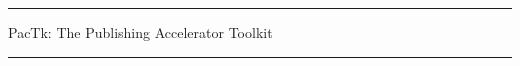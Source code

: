 \documentclass[11pt]{article}
\newcommand{\cyanhr}{{\textcolor{cyann!40}{\hrule}}}
\begin{document}


\thispagestyle{firstpage}



\begin{center}

{\cyanhr}

\vspace*{-34pt}

{\color{red!70!black}\selectfont





{\large{PacTk: The Publishing Accelerator Toolkit}}





}

{\cyanhr}


\end{center}







\vspace*{7pt}
\end{document}
